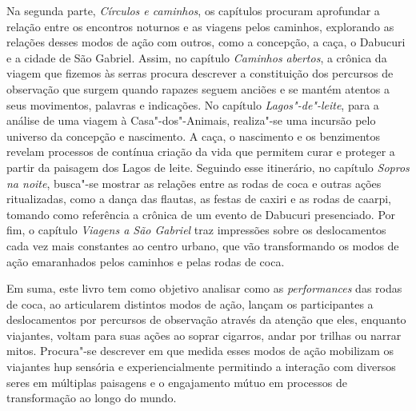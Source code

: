 Na segunda parte, \textit{Círculos e caminhos}, os capítulos procuram
aprofundar a relação entre os encontros noturnos e as viagens pelos
caminhos, explorando as relações desses modos de ação com outros, como a
concepção, a caça, o Dabucuri e a cidade de São Gabriel. Assim, no
capítulo \textit{Caminhos abertos}, a crônica da viagem que fizemos às
serras procura descrever a constituição dos percursos de observação que
surgem quando rapazes seguem anciões e se mantém atentos a seus
movimentos, palavras e indicações. No capítulo \textit{Lagos"-de"-leite},
para a análise de uma viagem à Casa"-dos"-Animais, realiza"-se uma incursão
pelo universo da concepção e nascimento. A caça, o nascimento e os
benzimentos revelam processos de contínua criação da vida que permitem
curar e proteger a partir da paisagem dos Lagos de leite. Seguindo esse
itinerário, no capítulo \textit{Sopros na noite}, busca"-se mostrar as
relações entre as rodas de coca e outras ações ritualizadas, como a
dança das flautas, as festas de caxiri e as rodas de caarpi, tomando
como referência a crônica de um evento de Dabucuri presenciado. Por fim,
o capítulo \textit{Viagens a São Gabriel} traz impressões sobre os
deslocamentos cada vez mais constantes ao centro urbano, que vão
transformando os modos de ação emaranhados pelos caminhos e pelas rodas
de coca.

Em suma, este livro tem como objetivo analisar como as
\textit{performances} das rodas de coca, ao articularem distintos modos de
ação, lançam os participantes a deslocamentos por percursos de
observação através da atenção que eles, enquanto viajantes, voltam para
suas ações ao soprar cigarros, andar por trilhas ou narrar mitos.
Procura"-se descrever em que medida esses modos de ação mobilizam os
viajantes hup sensória e experiencialmente permitindo a interação com
diversos seres em múltiplas paisagens e o engajamento mútuo em processos
de transformação ao longo do mundo.